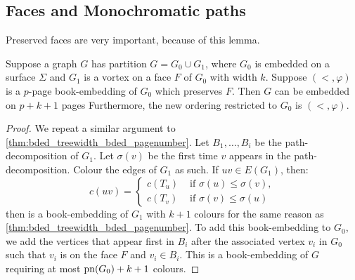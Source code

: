 \subsection{Faces and Monochromatic paths}

Preserved faces are very important, because of this lemma.

\begin{lemma}\label{lem:preserved_faces_pagenumber}
	Suppose a graph \(G\) has partition \(G = G_0 \cup G_1\), where \(G_0\) is embedded on a surface $\Sigma$ and \(G_1\) is a vortex on a face $F$ of $G_0$ with width \(k\). Suppose $(<, \varphi)$ is a $p$-page book-embedding of \(G_0\) which preserves \(F\). Then $G$ can be embedded on \(p + k + 1\) pages Furthermore, the new ordering restricted to $G_0$ is $(<, \varphi)$.
\end{lemma}

\begin{proof}
	We repeat a similar argument to \cref{thm:bded_treewidth_bded_pagenumber}. Let \(B_1, \ldots, B_i\) be the path-decomposition of \(G_1\). Let \(\sigma(v)\) be the first time \(v\) appears in the path-decomposition. Colour the edges of \(G_1\) as such. If \(uv \in E(G_1)\), then:
	\begin{equation}
		c(uv) =
		\begin{cases}
			c(T_u) & \text{ if } \sigma(u) \leq \sigma(v), \\
			c(T_v) & \text{ if } \sigma(v) \leq \sigma(u)
		\end{cases}
	\end{equation}
	then is a book-embedding of \(G_1\) with \(k+1\) colours for the same reason as \cref{thm:bded_treewidth_bded_pagenumber}.
	To add this book-embedding to \(G_0\), we add the vertices that appear first in \(B_i\) after the associated vertex \(v_i\) in \(G_0\) such that \(v_i\) is on the face \(F\) and \(v_i \in B_i\). This is a book-embedding of \(G\) requiring at most \(\operatorname{pn}(G_0) + k + 1\) colours.
\end{proof}


